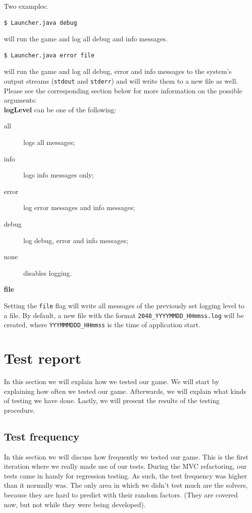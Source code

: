 \documentclass[a4paper,11pt,report]{scrartcl}
\begin{document}
Two examples:
\begin{verbatim}
$ Launcher.java debug
\end{verbatim}
will run the game and log all debug and info messages. 
\begin{verbatim}
$ Launcher.java error file
\end{verbatim}
will run the game and log all debug, error and info messages to the system's
output streams (\texttt{stdout} and \texttt{stderr}) and will write them to a
new file as well.\\

Please see the corresponding section below for more information on the possible
arguments:\\

\textbf{logLevel} can be one of the following:
\begin{description}
	\item[all] logs all messages;
	\item[info] logs info messages only;
	\item[error] log error messages and info messages;
	\item[debug] log debug, error and info messages;
	\item[none] disables logging.
\end{description}

\textbf{file}

Setting the \texttt{file} flag will write all messages of the previously set
logging level to a file. By default, a new file with the format
\texttt{2048\_YYYYMMDD\_HHmmss.log} will be created, where
\texttt{YYYMMMDDD\_HHmmss} is the time of application start.

\newpage\section{Test report}

In this section we will explain how we tested our game. We will start by
explaining how often we tested our game. Afterwards, we will explain what
kinds of testing we have done. Lastly, we will present the results of the
testing procedure.

\subsection{Test frequency}
In this section we will discuss how frequently we tested our game. This is the
first iteration where we really made use of our tests. During the MVC
refactoring, our tests came in handy for regression testing. As such, the test
frequency was higher than it normally was. The only area in which we didn't test
much are the solvers, because they are hard to predict with their random
factors. (They are covered now, but not while they were being developed).
\end{document}
